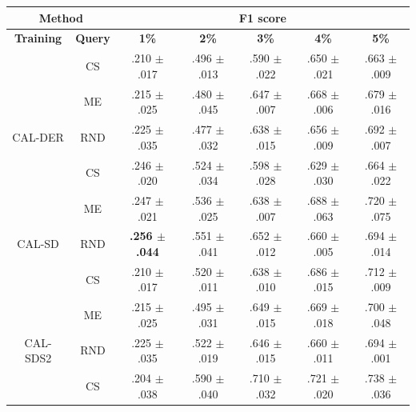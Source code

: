 \begin{table}[htbp]
\centering

\begin{tabular*}{\linewidth}{c|c|@{\extracolsep{\fill}}ccccc}
\toprule
\multicolumn{2}{c|}{\textbf{Method}} & \multicolumn{5}{c}{\textbf{F1 score}} \\
\midrule
\textbf{Training} & \textbf{Query} & \textbf{1\%} & \textbf{2\%} & \textbf{3\%} & \textbf{4\%} & \textbf{5\%}\\
\midrule
 & CS & .210 $\pm$ {\small .017} & .496 $\pm$ {\small .013} & .590 $\pm$ {\small .022} & .650 $\pm$ {\small .021} & .663 $\pm$ {\small .009}\\

 & ME & .215 $\pm$ {\small .025} & .480 $\pm$ {\small .045} & .647 $\pm$ {\small .007} & .668 $\pm$ {\small .006} & .679 $\pm$ {\small .016}\\

\multirow{-3}{*}{\raggedright\arraybackslash CAL-DER} & RND & .225 $\pm$ {\small .035} & .477 $\pm$ {\small .032} & .638 $\pm$ {\small .015} & .656 $\pm$ {\small .009} & .692 $\pm$ {\small .007}\\
\midrule
 & CS & .246 $\pm$ {\small .020} & .524 $\pm$ {\small .034} & .598 $\pm$ {\small .028} & .629 $\pm$ {\small .030} & .664 $\pm$ {\small .022}\\

 & ME & .247 $\pm$ {\small .021} & .536 $\pm$ {\small .025} & .638 $\pm$ {\small .007} & .688 $\pm$ {\small .063} & .720 $\pm$ {\small .075}\\

\multirow{-3}{*}{\raggedright\arraybackslash CAL-SD} & RND & \textbf{.256 $\pm$ {\small .044}} & .551 $\pm$ {\small .041} & .652 $\pm$ {\small .012} & .660 $\pm$ {\small .005} & .694 $\pm$ {\small .014}\\
\midrule
 & CS & .210 $\pm$ {\small .017} & .520 $\pm$ {\small .011} & .638 $\pm$ {\small .010} & .686 $\pm$ {\small .015} & .712 $\pm$ {\small .009}\\

 & ME & .215 $\pm$ {\small .025} & .495 $\pm$ {\small .031} & .649 $\pm$ {\small .015} & .669 $\pm$ {\small .018} & .700 $\pm$ {\small .048}\\

\multirow{-3}{*}{\raggedright\arraybackslash CAL-SDS2} & RND & .225 $\pm$ {\small .035} & .522 $\pm$ {\small .019} & .646 $\pm$ {\small .015} & .660 $\pm$ {\small .011} & .694 $\pm$ {\small .001}\\
\midrule
 & CS & .204 $\pm$ {\small .038} & .590 $\pm$ {\small .040} & .710 $\pm$ {\small .032} & .721 $\pm$ {\small .020} & .738 $\pm$ {\small .036}\\


\end{tabular*}
\end{table}
